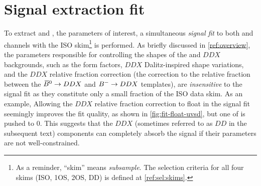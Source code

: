 \chapter{Signal extraction fit}
\label{ref:fit}

To extract \RD and \RDst, the parameters of interest,
a simultaneous \emph{signal fit}
to both \Dz and \Dstar channels with the ISO skim\footnote{
    As a reminder, ``skim'' means \emph{subsample}.
    The selection criteria for all four skims (ISO, 1OS, 2OS, DD) is defined at
    \cref{ref:sel:skims}.
} is performed.
As briefly discussed in \cref{ref:overview},
the parameters responsible for controlling the shapes of the \Dstst and
$DDX$ backgrounds,
such as the \Dstst form factors,
$DDX$ Dalitz-inspired shape variations,
and the $DDX$ relative fraction correction
(the correction to the relative fraction between the
${{\kern 0.18em\overline{\kern -0.18em B}}{}^0} \rightarrow DDX$ and ${{{B}^-}} \rightarrow DDX$ templates),
are \emph{insensitive} to the signal fit as they constitute only a small
fraction of the ISO data skim.
As an example,
Allowing the $DDX$ relative fraction correction to float in the signal fit
seemingly improves the fit quality,
as shown in \cref{fig:fit-float-uvsd},
but one of \RDX is pushed to 0.
This suggests that the $DDX$
(sometimes referred to as $DD$ in the subsequent text) components can completely
absorb the signal if their parameters are not well-constrained.

